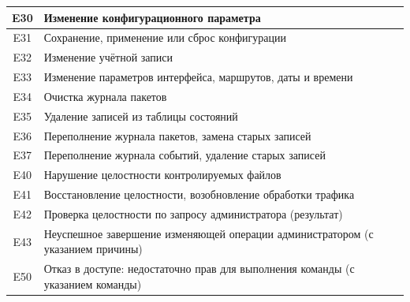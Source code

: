 \documentclass[13pt,a4paper,final]{article}
\begin{document}
\begin{xltabular}{\textwidth}{|c|X|}
		\hline
		E30 & Изменение конфигурационного параметра \\
		\hline
		E31 & Сохранение, применение или сброс конфигурации \\
		\hline
		E32 & Изменение учётной записи \\
		\hline
		E33 & Изменение параметров интерфейса, маршрутов, даты и времени \\
		\hline
		E34 & Очистка журнала пакетов \\
		\hline
		E35 & Удаление записей из таблицы состояний \\
		\hline
		E36 & Переполнение журнала пакетов, замена старых записей \\
		\hline
		E37 & Переполнение журнала событий, удаление старых записей \\
		\hline
		E40 & Нарушение целостности контролируемых файлов \\
		\hline
		E41 & Восстановление целостности, возобновление обработки трафика \\
		\hline
		E42 & Проверка целостности по запросу администратора (результат) \\
		\hline
		E43 & Неуспешное завершение изменяющей операции администратором (с указанием причины) \\
		\hline
		E50 & Отказ в доступе: недостаточно прав для выполнения команды (с указанием команды) \\
		\hline
	\end{xltabular}
	
\end{document}
